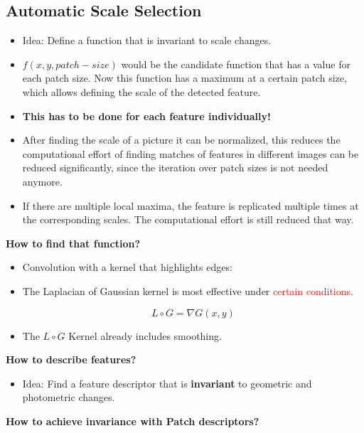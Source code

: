 \documentclass[10pt,a4paper]{scrartcl}
\begin{document}
\begin{multicols*}{2}
\subsection{Automatic Scale Selection}

\begin{itemize}
\item Idea: Define a function that is invariant to scale changes.
\item $f(x,y,patch-size)$ would be the candidate function that has a value for each patch size. Now this function has a maximum at a certain patch size, which allows defining the scale of the detected feature.
\item \textbf{This has to be done for each feature individually!}
\item After finding the scale of a picture it can be normalized, this reduces the computational effort of finding matches of features in different images can be reduced significantly, since the iteration over patch sizes is not needed anymore.
\item If there are multiple local maxima, the feature is replicated multiple times at the corresponding scales. The computational effort is still reduced that way.
\end{itemize}

\textbf{How to find that function?}

\begin{itemize}
\item Convolution with a kernel that highlights edges:

\item The Laplacian of Gaussian kernel is most effective under \textcolor{red}{certain conditions}.

\begin{equation*}
L\circ G=\nabla G(x,y)
\end{equation*}
\item The $L\circ G$ Kernel already includes smoothing.
\end{itemize}

\textbf{How to describe features?}

\begin{itemize}
\item Idea: Find a feature descriptor that is \textbf{invariant} to geometric and photometric changes.
\end{itemize}

\textbf{How to achieve invariance with Patch descriptors?}


\end{multicols*}
\end{document}
